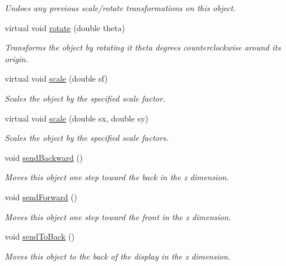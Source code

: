 \begin{DoxyCompactItemize}
\begin{DoxyCompactList}\small\item\em Undoes any previous scale/rotate transformations on this object. \end{DoxyCompactList}\item 
virtual void \mbox{\hyperlink{classsgl_1_1GObject_ae1ffaa12185dfd5ba464f7d87c329e26}{rotate}} (double theta)
\begin{DoxyCompactList}\small\item\em Transforms the object by rotating it {\ttfamily theta} degrees counterclockwise around its origin. \end{DoxyCompactList}\item 
virtual void \mbox{\hyperlink{classsgl_1_1GObject_ad2e1900f730475c2d044817db03b38d6}{scale}} (double sf)
\begin{DoxyCompactList}\small\item\em Scales the object by the specified scale factor. \end{DoxyCompactList}\item 
virtual void \mbox{\hyperlink{classsgl_1_1GObject_a63641f69d610d0b951357d35a0c3b1e3}{scale}} (double sx, double sy)
\begin{DoxyCompactList}\small\item\em Scales the object by the specified scale factors. \end{DoxyCompactList}\item 
void \mbox{\hyperlink{classsgl_1_1GObject_ab6747f40313c531c2db32edb5b63b9b7}{send\+Backward}} ()
\begin{DoxyCompactList}\small\item\em Moves this object one step toward the back in the {\itshape z} dimension. \end{DoxyCompactList}\item 
void \mbox{\hyperlink{classsgl_1_1GObject_a710b3e449c9facba7847c91ab170d281}{send\+Forward}} ()
\begin{DoxyCompactList}\small\item\em Moves this object one step toward the front in the {\itshape z} dimension. \end{DoxyCompactList}\item 
void \mbox{\hyperlink{classsgl_1_1GObject_a0f7f1efbb7fd46dde2867c4ad0330896}{send\+To\+Back}} ()
\begin{DoxyCompactList}\small\item\em Moves this object to the back of the display in the {\itshape z} dimension. \end{DoxyCompactList}\item 

\end{DoxyCompactItemize}
